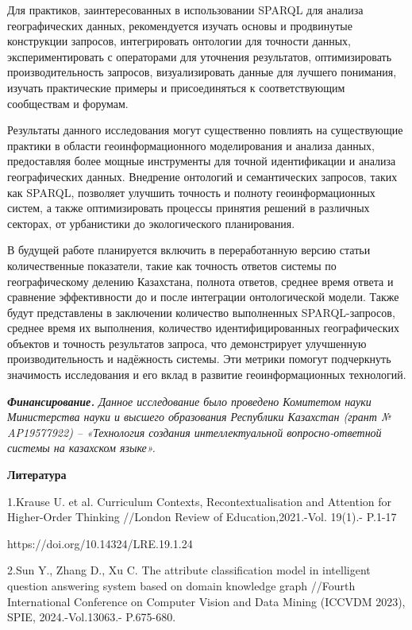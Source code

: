 Для практиков, заинтересованных в использовании SPARQL для анализа
географических данных, рекомендуется изучать основы и продвинутые
конструкции запросов, интегрировать онтологии для точности данных,
экспериментировать с операторами для уточнения результатов,
оптимизировать производительность запросов, визуализировать данные для
лучшего понимания, изучать практические примеры и присоединяться к
соответствующим сообществам и форумам.

Результаты данного исследования могут существенно повлиять на
существующие практики в области геоинформационного моделирования и
анализа данных, предоставляя более мощные инструменты для точной
идентификации и анализа географических данных. Внедрение онтологий и
семантических запросов, таких как SPARQL, позволяет улучшить точность и
полноту геоинформационных систем, а также оптимизировать процессы
принятия решений в различных секторах, от урбанистики до экологического
планирования.

В будущей работе планируется включить в переработанную версию статьи
количественные показатели, такие как точность ответов системы по
географическому делению Казахстана, полнота ответов, среднее время
ответа и сравнение эффективности до и после интеграции онтологической
модели. Также будут представлены в заключении количество выполненных
SPARQL-запросов, среднее время их выполнения, количество
идентифицированных географических объектов и точность результатов
запроса, что демонстрирует улучшенную производительность и надёжность
системы. Эти метрики помогут подчеркнуть значимость исследования и его
вклад в развитие геоинформационных технологий.

\emph{\textbf{Финансирование.} Данное исследование было проведено
Комитетом науки Министерства науки и высшего образования Республики
Казахстан (грант № AP19577922) -- «Технология создания интеллектуальной
вопросно-ответной системы на казахском языке».}

\textbf{Литература}

1.Krause U. et al. Curriculum Contexts, Recontextualisation and
Attention for Higher-Order Thinking //London Review of
Education,2021.-Vol. 19(1).- P.1-17

https://doi.org/10.14324/LRE.19.1.24

2.Sun Y., Zhang D., Xu C. The attribute classification model in
intelligent question answering system based on domain knowledge graph
//Fourth International Conference on Computer Vision and Data Mining
(ICCVDM 2023), SPIE, 2024.-Vol.13063.- P.675-680.

